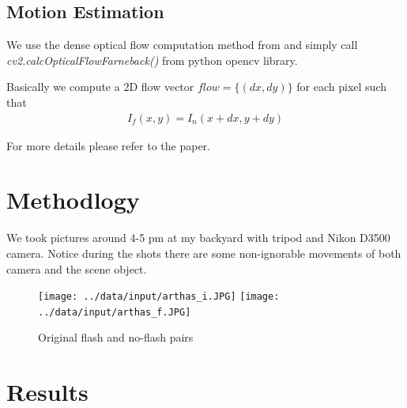 \documentclass[final]{cvpr}
\begin{document}
\subsection{Motion Estimation}
We use the dense optical flow computation method from \cite{Authors2} and 
simply call \textit{cv2.calcOpticalFlowFarneback()} from python opencv library.

Basically we compute a 2D flow vector $flow = \{(dx,dy)\}$ for each pixel such 
that  
\begin{align}
   I_f(x,y) = I_n(x+dx,y+dy)
\end{align}

For more details please refer to the paper.

\section{Methodlogy}
We took pictures around 4-5 pm at my backyard with tripod and Nikon D3500 camera.
Notice during the shots there are some non-ignorable movements of both camera 
and the scene object.


\begin{figure}[ht]
   \centering
   \texttt{[image: ../data/input/arthas\_i.JPG]}
   \texttt{[image: ../data/input/arthas\_f.JPG]}
   \caption{Original flash and no-flash pairs}
\end{figure}

\newpage
\section{Results}
\end{document}
